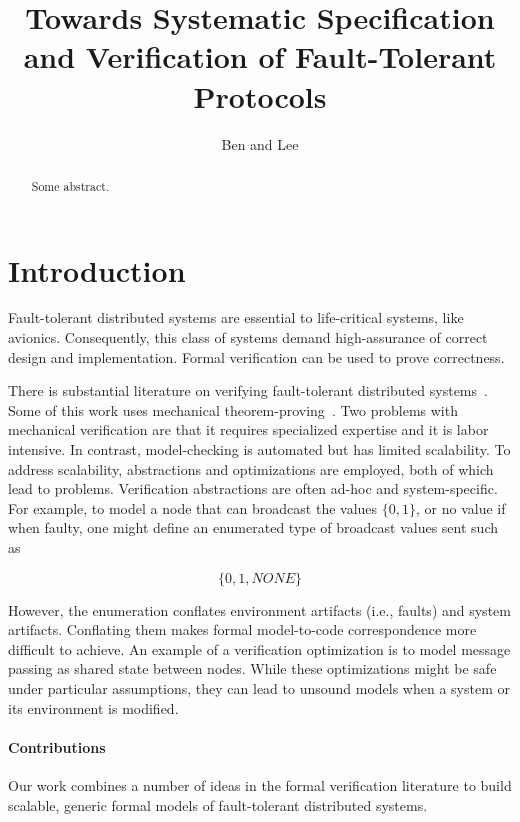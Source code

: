 \documentclass{IEEEtran/IEEEtran}
\begin{document}
\title{Towards Systematic Specification and Verification of Fault-Tolerant Protocols}
\author{Ben and Lee}


\maketitle


\begin{abstract}
  Some abstract.
\end{abstract}

\section{Introduction}

Fault-tolerant distributed systems are essential to life-critical systems, like avionics. Consequently, this class of systems demand high-assurance of correct design and implementation. Formal verification can be used to prove correctness.

There is substantial literature on verifying fault-tolerant distributed systems~\cite{}. Some of this work uses mechanical theorem-proving~\cite{}. Two problems with mechanical verification are that it requires specialized expertise and it is labor intensive. In contrast, model-checking is automated but has limited scalability. To address scalability, abstractions and optimizations are employed, both of which lead to problems. Verification abstractions are often ad-hoc and system-specific. For example, to model a node that can broadcast the values $\{0, 1\}$, or no value if when faulty, one might define an enumerated type of broadcast values sent such as

$$\{0, 1, NONE\}$$

However, the enumeration conflates environment artifacts (i.e., faults) and system artifacts. Conflating them makes formal model-to-code correspondence more difficult to achieve. An example of a verification optimization is to model message passing as shared state between nodes. While these optimizations might be safe under particular assumptions, they can lead to unsound models when a system or its environment is modified.

\paragraph{Contributions}

Our work combines a number of ideas in the formal verification literature to build scalable, generic formal models of fault-tolerant distributed systems.
\end{document}
